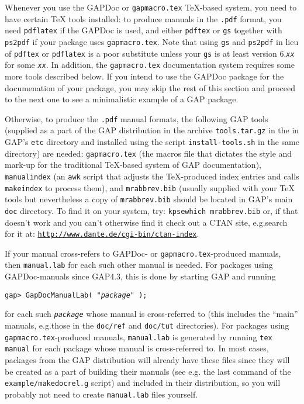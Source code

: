 \documentclass[a4paper,11pt]{report}
\begin{document}
{{ Whenever you use the \textsf{GAPDoc} or \texttt{gapmacro.tex} {\TeX}-based system, you need to have certain {\TeX} tools installed: to produce manuals in the \texttt{.pdf} format, you need \texttt{pdflatex} if the \textsf{GAPDoc} is used, and either \texttt{pdftex} or \texttt{gs} together with \texttt{ps2pdf} if your package uses \texttt{gapmacro.tex}. Note that using \texttt{gs} and \texttt{ps2pdf} in lieu of \texttt{pdftex} or \texttt{pdflatex} is a poor substitute unless your \texttt{gs} is at least version 6.\mbox{\texttt{\mdseries\slshape xx}} for some \mbox{\texttt{\mdseries\slshape xx}}. In addition, the \texttt{gapmacro.tex} documentation system requires some more tools described below. If you intend
to use the \textsf{GAPDoc} package for the documenation of your package, you may skip the rest of this
section and proceed to the next one to see a minimalistic example of a \textsf{GAP} package. 

  Otherwise, to produce the \texttt{.pdf} manual formats, the following \textsf{GAP} tools (supplied as a part of the \textsf{GAP} distribution in the archive \texttt{tools.tar.gz} in the in \textsf{GAP}'s \texttt{etc} directory and installed using the script \texttt{install-tools.sh} in the same directory) are needed: \texttt{gapmacro.tex} (the macros file that dictates the style and mark-up for the traditional {\TeX}-based system of \textsf{GAP} documentation), \texttt{manualindex} (an \texttt{awk} script that adjusts the {\TeX}-produced index entries and calls \texttt{makeindex} to process them), and \texttt{mrabbrev.bib} (usually supplied with your {\TeX} tools but nevertheless a copy of \texttt{mrabbrev.bib} should be located in \textsf{GAP}'s main \texttt{doc} directory. To find it on your system, try: \texttt{kpsewhich mrabbrev.bib} or, if that doesn't work and you can't otherwise find it check out a CTAN
site, e.g.{\nobreakspace}search for it at: \href{http://www.dante.de/cgi-bin/ctan-index} {\texttt{http://www.dante.de/cgi-bin/ctan-index}}. 

 If your manual cross-refers to \textsf{GAPDoc}- or \texttt{gapmacro.tex}-produced manuals, then \texttt{manual.lab} for each such other manual is needed. For packages using \textsf{GAPDoc}-manuals since \textsf{GAP}{\nobreakspace}4.3, this is done by starting \textsf{GAP} and running 

 {\nobreakspace}{\nobreakspace}\texttt{gap{\textgreater} GapDocManualLab( "\mbox{\texttt{\mdseries\slshape package}}" );} 

 \noindent for each such \mbox{\texttt{\mdseries\slshape package}} whose manual is cross-referred to (this includes the ``main'' manuals, e.g.{\nobreakspace}those in the \texttt{doc/ref} and \texttt{doc/tut} directories). For packages using \texttt{gapmacro.tex}-produced manuals, \texttt{manual.lab} is generated by running \texttt{tex manual} for each package whose manual is cross-referred to. In most cases, packages
from the \textsf{GAP} distribution will already have these files since they will be created as a
part of building their manuals (see e.g. the last command of the \texttt{example/makedocrel.g} script) and included in their distribution, so you will probably not need to
create \texttt{manual.lab} files yourself. 

}}
\end{document}
